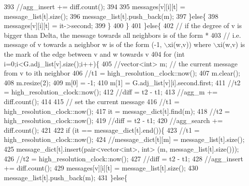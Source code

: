 \begin{DoxyCode}
393 \textcolor{comment}{            //agg\_insert += diff.count();}
394 \textcolor{comment}{}
395 \textcolor{comment}{            messages[v][i][t] = message\_list[t].size();}
396 \textcolor{comment}{            message\_list[t].push\_back(m);}
397 \textcolor{comment}{          \}else\{}
398 \textcolor{comment}{            messages[v][i][t] = it->second;}
399 \textcolor{comment}{          \}}
400 \textcolor{comment}{        \}}
401 \textcolor{comment}{      \}else\{}
402 \textcolor{comment}{        // if the degree of v is bigger than Delta, the message towards all neighbors is of the form *}
403 \textcolor{comment}{        // i.e. message of v towards a neighbor w is of the form (-1, \(\backslash\)xi(w,v)) where \(\backslash\)xi(w,v) is the mark
       of the edge between v and w towards v}
404 \textcolor{comment}{        for (int i=0;i<G.adj\_list[v].size();i++)\{}
405 \textcolor{comment}{          //vector<int> m; // the current message from v to ith neighbor}
406 \textcolor{comment}{          //t1 = high\_resolution\_clock::now();}
407 \textcolor{comment}{          m.clear();}
408 \textcolor{comment}{          m.resize(2);}
409 \textcolor{comment}{          m[0] = -1;}
410 \textcolor{comment}{          m[1] = G.adj\_list[v][i].second.first;}
411 \textcolor{comment}{          //t2 = high\_resolution\_clock::now();}
412 \textcolor{comment}{          //diff = t2 - t1;}
413 \textcolor{comment}{          //agg\_m += diff.count();}
414 \textcolor{comment}{}
415 \textcolor{comment}{          // set the current message}
416 \textcolor{comment}{          //t1 = high\_resolution\_clock::now();}
417 \textcolor{comment}{          it = message\_dict[t].find(m);}
418 \textcolor{comment}{          //t2 = high\_resolution\_clock::now();}
419 \textcolor{comment}{          //diff = t2 - t1;}
420 \textcolor{comment}{          //agg\_search += diff.count();}
421 \textcolor{comment}{}
422 \textcolor{comment}{          if (it == message\_dict[t].end())\{}
423 \textcolor{comment}{            //t1 = high\_resolution\_clock::now();}
424 \textcolor{comment}{            //message\_dict[t][m] = message\_list[t].size();}
425 \textcolor{comment}{            message\_dict[t].insert(pair<vector<int>, int> (m, message\_list[t].size()));}
426 \textcolor{comment}{            //t2 = high\_resolution\_clock::now();}
427 \textcolor{comment}{            //diff = t2 - t1;}
428 \textcolor{comment}{            //agg\_insert += diff.count();}
429 \textcolor{comment}{            messages[v][i][t] = message\_list[t].size();}
430 \textcolor{comment}{            message\_list[t].push\_back(m);}
431 \textcolor{comment}{          \}else\{}

\end{DoxyCode}
